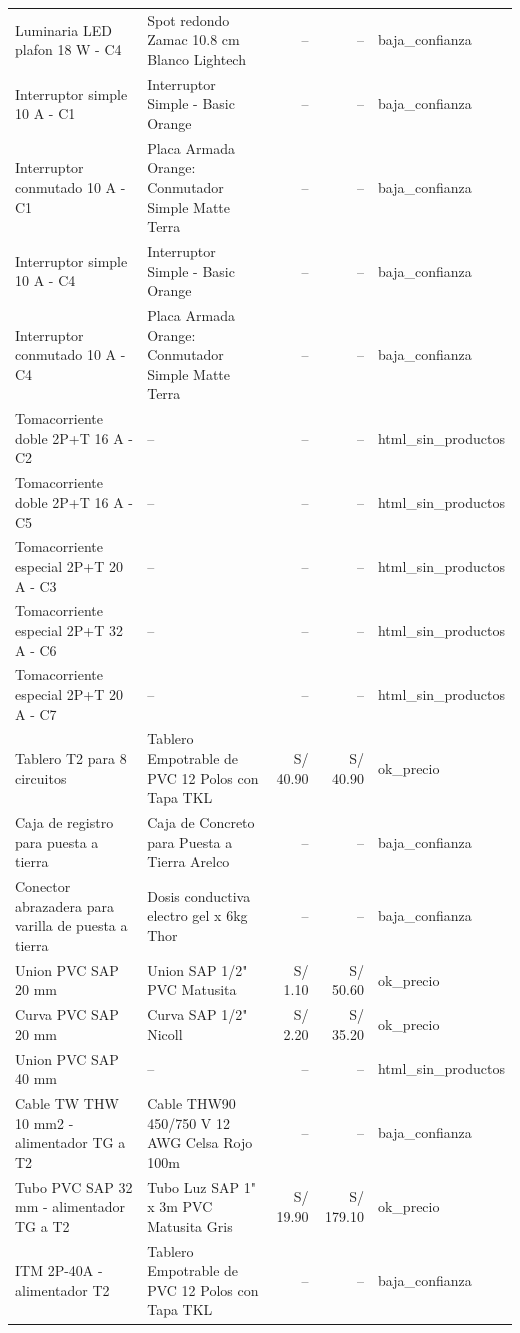 \documentclass[11pt,a4paper]{article}
\begin{document}
\begin{longtable}{p{} p{} r r p{}}
Luminaria LED plafon 18 W - C4 & Spot redondo Zamac 10.8 cm Blanco Lightech & -- & -- & baja\_confianza \\
Interruptor simple 10 A - C1 & Interruptor Simple - Basic Orange & -- & -- & baja\_confianza \\
Interruptor conmutado 10 A - C1 & Placa Armada Orange: Conmutador Simple Matte Terra & -- & -- & baja\_confianza \\
Interruptor simple 10 A - C4 & Interruptor Simple - Basic Orange & -- & -- & baja\_confianza \\
Interruptor conmutado 10 A - C4 & Placa Armada Orange: Conmutador Simple Matte Terra & -- & -- & baja\_confianza \\
Tomacorriente doble 2P+T 16 A - C2 & -- & -- & -- & html\_sin\_productos \\
Tomacorriente doble 2P+T 16 A - C5 & -- & -- & -- & html\_sin\_productos \\
Tomacorriente especial 2P+T 20 A - C3 & -- & -- & -- & html\_sin\_productos \\
Tomacorriente especial 2P+T 32 A - C6 & -- & -- & -- & html\_sin\_productos \\
Tomacorriente especial 2P+T 20 A - C7 & -- & -- & -- & html\_sin\_productos \\
Tablero T2 para 8 circuitos & Tablero Empotrable de PVC 12 Polos con Tapa TKL & S/ 40.90 & S/ 40.90 & ok\_precio \\
Caja de registro para puesta a tierra & Caja de Concreto para Puesta a Tierra Arelco & -- & -- & baja\_confianza \\
Conector abrazadera para varilla de puesta a tierra & Dosis conductiva electro gel x 6kg Thor & -- & -- & baja\_confianza \\
Union PVC SAP 20 mm & Union SAP 1/2" PVC Matusita & S/ 1.10 & S/ 50.60 & ok\_precio \\
Curva PVC SAP 20 mm & Curva SAP 1/2" Nicoll & S/ 2.20 & S/ 35.20 & ok\_precio \\
Union PVC SAP 40 mm & -- & -- & -- & html\_sin\_productos \\
Cable TW THW 10 mm2 - alimentador TG a T2 & Cable THW90 450/750 V 12 AWG Celsa Rojo 100m & -- & -- & baja\_confianza \\
Tubo PVC SAP 32 mm - alimentador TG a T2 & Tubo Luz SAP 1" x 3m PVC Matusita Gris & S/ 19.90 & S/ 179.10 & ok\_precio \\
ITM 2P-40A - alimentador T2 & Tablero Empotrable de PVC 12 Polos con Tapa TKL & -- & -- & baja\_confianza \\
\bottomrule\end{longtable}
\end{document}
